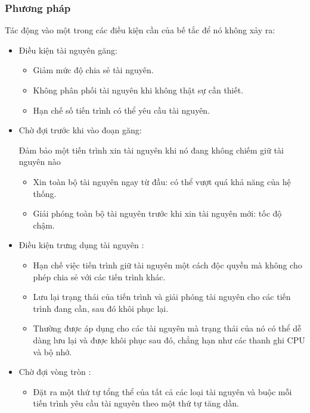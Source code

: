 \documentclass[12pt]{report}
\begin{document}
\subsubsection*{Phương pháp}
Tác động vào một trong các điều kiện cần của bế tắc để nó không xảy ra:
\begin{itemize}
	\item Điều kiện tài nguyên găng:
	      \begin{itemize}
	      	\item Giảm mức độ chia sẻ tài nguyên.
	      	\item Không phân phối tài nguyên khi không thật sự cần thiết.
	      	\item Hạn chế số tiến trình có thể yêu cầu tài nguyên.
	      \end{itemize}
	\item Chờ đợi trước khi vào đoạn găng:
	                  
	      Đảm bảo một tiến trình xin tài nguyên khi nó đang không chiếm giữ tài nguyên nào
	      \begin{itemize}
	      	\item Xin toàn bộ tài nguyên ngay từ đầu: có thể vượt quá khả năng của hệ thống.
	      	\item Giải phóng toàn bộ tài nguyên trước khi xin tài nguyên mới: tốc độ chậm.
	      \end{itemize}
	\item Điều kiện trưng dụng tài nguyên : 
	      \begin{itemize}
	      	\item Hạn chế việc tiến trình giữ tài nguyên một cách độc quyền mà không cho phép chia sẻ với các tiến trình khác.
	      	\item Lưu lại trạng thái của tiến trình và giải phóng tài nguyên cho các tiến trình đang cần, sau đó khôi phục lại.
	      	\item Thường được áp dụng cho các tài nguyên mà trạng thái của nó có thể dễ dàng lưu lại và được khôi phục sau đó, chẳng hạn như các thanh ghi CPU và bộ nhớ.
	      \end{itemize}
	\item Chờ đợi vòng tròn : 
	      \begin{itemize}
	      	\item Đặt ra một thứ tự tổng thể của
	      	      tất cả các loại tài nguyên và buộc mỗi tiến trình yêu cầu tài nguyên theo một thứ tự tăng dần.
	      \end{itemize}
\end{itemize}
\end{document}
